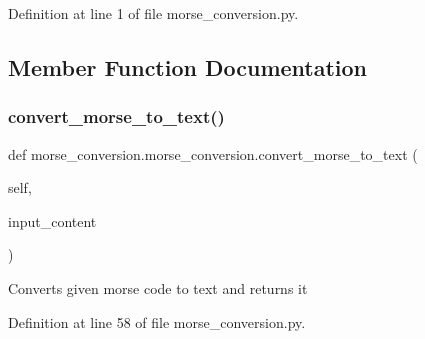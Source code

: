 Definition at line 1 of file morse\+\_\+conversion.\+py.



\subsection{Member Function Documentation}
\mbox{\label{classmorse__conversion_1_1morse__conversion_a541fbc681012d7974aba16a1a1460bc2}} 
\subsubsection{\texorpdfstring{convert\+\_\+morse\+\_\+to\+\_\+text()}{convert\_morse\_to\_text()}}
{\footnotesize\ttfamily def morse\+\_\+conversion.\+morse\+\_\+conversion.\+convert\+\_\+morse\+\_\+to\+\_\+text (\begin{DoxyParamCaption}\item[{}]{self,  }\item[{}]{input\+\_\+content }\end{DoxyParamCaption})}

\begin{DoxyVerb}Converts given morse code to text and returns it\end{DoxyVerb}
 

Definition at line 58 of file morse\+\_\+conversion.\+py.


